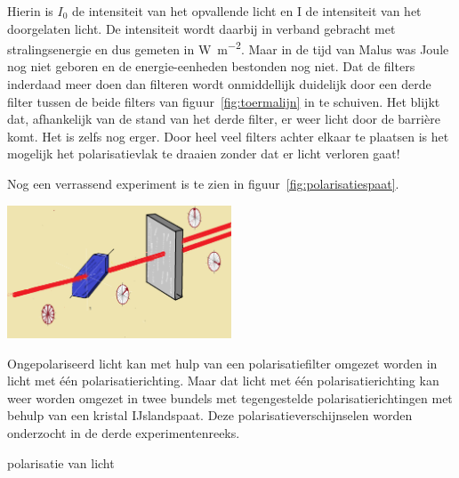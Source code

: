 \documentclass[../main.tex]{subfiles}
\begin{document}
Hierin is $I_0$ de intensiteit van het opvallende licht en I de intensiteit van het doorgelaten licht. De intensiteit wordt daarbij in verband gebracht met stralingsenergie en dus gemeten in \si{\watt\per\meter\squared}. Maar in de tijd van Malus was Joule nog niet geboren en de energie-eenheden bestonden nog niet. 
Dat de filters inderdaad meer doen dan filteren wordt onmiddellijk duidelijk door een derde filter tussen de beide filters van figuur~\ref{fig:toermalijn} in te schuiven. Het blijkt dat, afhankelijk van de stand van het derde filter, er weer licht door de barri\`ere komt. Het is zelfs nog erger. Door heel veel filters achter elkaar te plaatsen is het mogelijk het polarisatievlak te draaien zonder dat er licht verloren gaat! 

Nog een verrassend experiment is te zien in figuur~\ref{fig:polarisatiespaat}.

\begin{center}
\leavevmode
\includegraphics[width=0.5\textwidth]{./img/polarisatiespaat.png}
\end{center}

Ongepolariseerd licht kan met hulp van een polarisatiefilter omgezet worden in licht met \'e\'en polarisatierichting. Maar dat licht met \'e\'en polarisatierichting kan weer worden omgezet in twee bundels met tegengestelde polarisatierichtingen met behulp van een kristal IJslandspaat. Deze polarisatieverschijnselen worden onderzocht in de derde experimentenreeks.
\begin{experiment}{polarisatie van licht}
\end{experiment}
\end{document}
